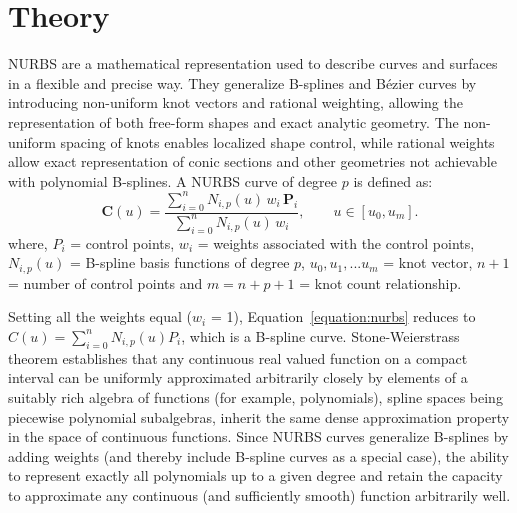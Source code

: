 \documentclass{article}
\begin{document}
\section{Theory}
NURBS \cite{nurbs} are a mathematical representation used to describe curves and surfaces 
in a flexible and precise way. They generalize B-splines and Bézier \cite{Prautzsch2002Bezier} curves 
by introducing non-uniform knot vectors and rational weighting, 
allowing the representation of both free-form shapes and 
exact analytic geometry. The non-uniform spacing of knots enables localized shape control, 
while rational weights allow exact representation of conic sections 
and other geometries not achievable with polynomial B-splines.
A NURBS curve of degree $p$ is defined as:
\begin{equation}\label{equation:nurbs}
\mathbf{C}(u)=
\frac{
\displaystyle\sum_{i=0}^{n} N_{i,p}(u)\, w_i\, \mathbf{P}_i
}{
\displaystyle\sum_{i=0}^{n} N_{i,p}(u)\, w_i
},
\qquad u \in [u_0, u_m].
\end{equation}
where, $P_i$ = control points, $w_i$ = weights associated with the control points, 
$N_{i,p}(u)$ = B-spline basis functions of degree $p$, ${u_0, u_1,...u_m}$ = knot vector, 
$n + 1$ = number of control points and $m = n + p + 1$ = knot count relationship.

Setting all the weights equal ($w_i$ = 1), Equation~\ref{equation:nurbs} reduces to 
$C(u) = \displaystyle\sum_{i=0}^{n} N_{i,p}(u)P_i$, which is a B-spline curve.
Stone-Weierstrass theorem \cite{stone1948generalized} establishes that any continuous real valued 
function on a compact interval can be uniformly approximated arbitrarily 
closely by elements of a suitably rich algebra of functions 
(for example, polynomials), spline spaces being piecewise polynomial 
subalgebras, inherit the same dense approximation property 
in the space of continuous functions. Since NURBS curves 
generalize B-splines by adding weights 
(and thereby include B-spline curves as a special case), the ability to represent exactly all 
polynomials up to a given degree and retain the capacity to approximate any 
continuous (and sufficiently smooth) function arbitrarily well.
\end{document}
